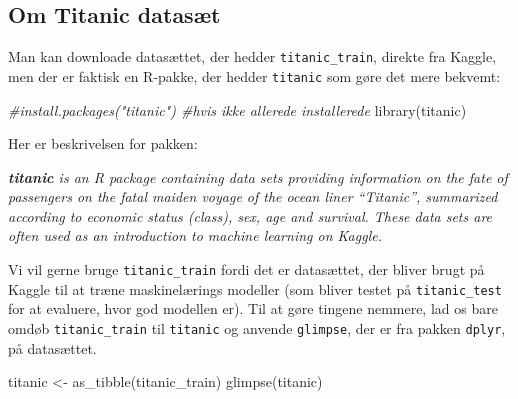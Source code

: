 \documentclass[
]{book}
\newenvironment{Shaded}{\begin{snugshade}}{\end{snugshade}}
\newcommand{\CommentTok}[1]{\textcolor[rgb]{0.56,0.35,0.01}{\textit{#1}}}
\newcommand{\FunctionTok}[1]{\textcolor[rgb]{0.00,0.00,0.00}{#1}}
\newcommand{\NormalTok}[1]{#1}
\newcommand{\OtherTok}[1]{\textcolor[rgb]{0.56,0.35,0.01}{#1}}
\begin{document}
\hypertarget{om-titanic-datasuxe6t}{%
\subsection{\texorpdfstring{Om \textbf{Titanic} datasæt}{Om Titanic datasæt}}\label{om-titanic-datasuxe6t}}

Man kan downloade datasættet, der hedder \texttt{titanic\_train}, direkte fra Kaggle, men der er faktisk en R-pakke, der hedder \texttt{titanic} som gøre det mere bekvemt:

\begin{Shaded}
\begin{Highlighting}[]
\CommentTok{\#install.packages("titanic") \#hvis ikke allerede installerede}
\FunctionTok{library}\NormalTok{(titanic)}
\end{Highlighting}
\end{Shaded}

Her er beskrivelsen for pakken:

\emph{\textbf{titanic} is an R package containing data sets providing information on the fate of passengers on the fatal maiden voyage of the ocean liner ``Titanic'', summarized according to economic status (class), sex, age and survival. These data sets are often used as an introduction to machine learning on Kaggle.}

Vi vil gerne bruge \texttt{titanic\_train} fordi det er datasættet, der bliver brugt på Kaggle til at træne maskinelærings modeller (som bliver testet på \texttt{titanic\_test} for at evaluere, hvor god modellen er). Til at gøre tingene nemmere, lad os bare omdøb \texttt{titanic\_train} til \texttt{titanic} og anvende \texttt{glimpse}, der er fra pakken \texttt{dplyr}, på datasættet.

\begin{Shaded}
\begin{Highlighting}[]
\NormalTok{titanic }\OtherTok{\textless{}{-}} \FunctionTok{as\_tibble}\NormalTok{(titanic\_train)}
\FunctionTok{glimpse}\NormalTok{(titanic)}
\end{Highlighting}
\end{Shaded}
\end{document}
